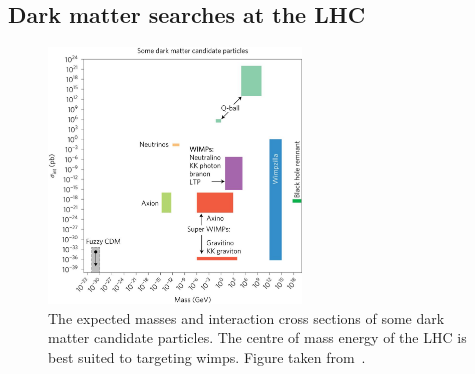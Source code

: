 \subsection{Dark matter searches at the LHC}
\label{subsec:dm_searches_lhc}

\begin{figure}[htbp]
    \centering
    \includegraphics[width=0.6\textwidth]{figures/dm_masses_xsecs.jpg}
    \caption[The expected masses and interaction cross sections of some dark matter candidate particles. The centre of mass energy of the LHC is best suited to targeting \glspl{wimp}]{The expected masses and interaction cross sections of some dark matter candidate particles. The centre of mass energy of the LHC is best suited to targeting \glspl{wimp}. Figure taken from~\cite{Conrad:2017pms}.}
\end{figure}

\iffalse


